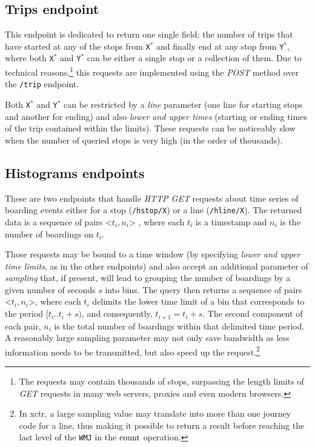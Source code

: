     \subsection{Trips endpoint}
    This endpoint is dedicated to return one single field: the number of trips that have started at any of the stops from \texttt{X$^*$} and finally end at any stop from \texttt{Y$^*$}, where both \texttt{X$^*$} and \texttt{Y$^*$} can be either a single stop or a collection of them. Due to technical reasons,\footnote{The requests may contain thousands of stops, surpassing the length limits of {\em GET} requests in many web servers, proxies and even modern browsers.} this requests are implemented using the {\em POST} method over the \texttt{/trip} endpoint.
    
    Both \texttt{X$^*$} and \texttt{Y$^*$} can be restricted by a \textit{line} parameter (one line for starting stops and another for ending) and also \textit{lower and upper times} (starting or ending times of the trip contained within the limits). These requests can be noticeably slow when the number of queried stops is very high (in the order of thousands).
    
    \subsection{Histograms endpoints}
    These are two endpoints that handle {\em HTTP GET} requests about time series of boarding events either for a stop (\texttt{/hstop/X}) or a line (\texttt{/hline/X}). The returned data is a sequence of pairs <$t_i,n_i$> , where each $t_i$ is a timestamp and $n_i$ is the number of boardings on $t_i$.
    
    Those requests may be bound to a time window (by specifying \textit{lower and upper time limits}, as in the other endpoints) and also accept an additional parameter of \textit{sampling} that, if present, will lead to grouping the number of boardings by a given number of seconds $s$ into bins. The query then returns a sequence of pairs <$t_i,n_i$>, where each $t_i$ delimits the lower time limit of a bin that corresponds to the period $[t_i..t_i+s)$, and consequently, $t_{i+1} = t_i+s$. The second component of each pair, $n_i$ is the total number of boardings within that delimited time period. A reasonably large sampling parameter may not only save bandwidth as less information needs to be transmitted, but also speed up the request.\footnote{In \gls{xctr}, a large sampling value may translate into more than one journey code for a line, thus making it possible to return a result before reaching the last level of the \texttt{WMJ} in the $\operatorname{count}$ operation.}
	
